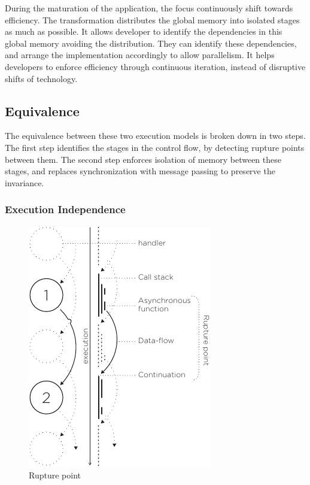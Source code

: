 During the maturation of the application, the focus continuously shift towards efficiency.
The transformation distributes the global memory into isolated stages as much as possible.
It allows developer to identify the dependencies in this global memory avoiding the distribution.
They can identify these dependencies, and arrange the implementation accordingly to allow parallelism.
It helps developers to enforce efficiency through continuous iteration, instead of disruptive shifts of technology.




\subsection{Equivalence} \label{chapter4:equivalence}

The equivalence between these two execution models is broken down in two steps. %
The first step identifies the stages in the control flow, by detecting rupture points between them.
The second step enforces isolation of memory between these stages, and replaces synchronization with message passing to preserve the invariance.

\subsubsection{Execution Independence}

\begin{figure}
  \centering
  \includegraphics[height=0.5\textwidth]{../resources/rupture-point.pdf}
  \caption{Rupture point}
  \label{fig:rupture-point}
  \vspace{-40pt}
\end{figure}

